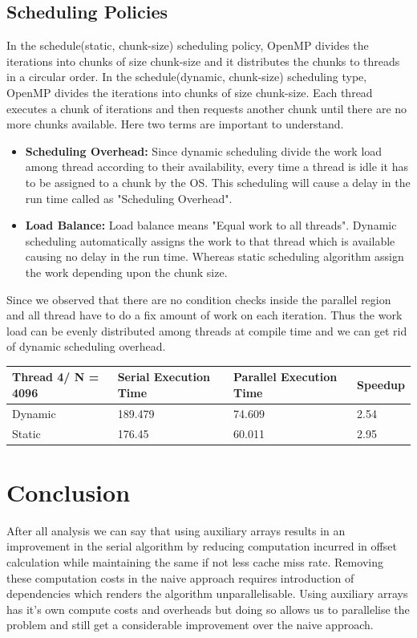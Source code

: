 \documentclass{article}
\begin{document}
\subsection{Scheduling Policies}
In the schedule(static, chunk-size) scheduling policy, OpenMP divides the iterations into chunks of size chunk-size and it distributes the chunks to threads in a circular order. In the schedule(dynamic, chunk-size) scheduling type, OpenMP divides the iterations into chunks of size chunk-size. Each thread executes a chunk of iterations and then requests another chunk until there are no more chunks available. Here two terms are important to understand.
\begin{itemize}
    \item \textbf{Scheduling Overhead:} Since dynamic scheduling divide the work load among thread according to their availability, every time a thread is idle it has to be assigned to a chunk by the OS. This scheduling will cause a delay in the run time called as "Scheduling Overhead".
    \item \textbf{Load Balance:} Load balance means "Equal work to all threads". Dynamic scheduling automatically assigns the work to that thread which is available causing no delay in the run time. Whereas static scheduling algorithm assign the work depending upon the chunk size.
\end{itemize}
Since we observed that there are no condition checks inside the parallel region and all thread have to do a fix amount of work on each iteration. Thus the work load can be evenly distributed among threads at compile time and we can get rid of dynamic scheduling overhead.
\begin{table}[!h]
\centering
\begin{tabular}{|l|l|l|l|} \hline
Thread 4/ N = 4096 & Serial Execution Time & Parallel Execution Time & Speedup \\ \hline
Dynamic         & 189.479                &     74.609              &     2.54 \\
Static         & 176.45                & 60.011                  & 2.95    \\ \hline
\end{tabular}
\end{table}


\section{Conclusion}
After all analysis we can say that using auxiliary arrays results in an improvement in the serial algorithm by reducing computation incurred in offset calculation while maintaining the same if not less cache miss rate. Removing these computation costs in the naive approach requires introduction of dependencies which renders the algorithm unparallelisable. Using auxiliary arrays has it's own compute costs and overheads but doing so allows us to parallelise the problem and still get a considerable improvement over the naive approach.
\end{document}
